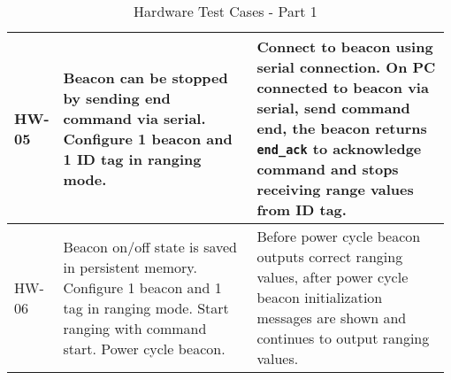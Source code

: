 \begin{table}[h!]
\begin{tabular}{|p{0.075\linewidth}|p{0.45\linewidth}|p{0.45\linewidth}|}
	\hline  
	HW-05
	& Beacon can be stopped by sending end command via serial. Configure 1 beacon and 1 ID tag in ranging mode.
	& Connect to beacon using serial connection.
	On PC connected to beacon via serial, send command end, the beacon returns \texttt{end\_ack} to acknowledge command and stops receiving range values from ID tag.\\
	
	\hline  
	HW-06
	& Beacon on/off state is saved in persistent memory. Configure 1 beacon and 1 tag in ranging mode. Start ranging with command start. Power cycle beacon.
	& Before power cycle beacon outputs correct ranging values, after power cycle beacon initialization messages are shown and continues to output ranging values.\\

    \hline
    \end{tabular}
    \caption{Hardware Test Cases - Part 1}
\end{table}

